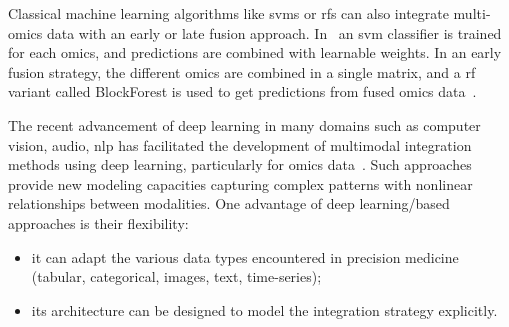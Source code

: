 \documentclass[../main.tex]{subfiles}
\begin{document}
	Classical machine learning algorithms like \glspl{svm} or \glspl{rf} can also integrate multi-omics data with an early or late fusion approach.
	In~\cite{CarrilloPerez2022} an \gls{svm} classifier is trained for each omics, and predictions are combined with learnable weights.
	In an early fusion strategy, the different omics are combined in a single matrix, and a \gls{rf} variant called BlockForest is used to get predictions from fused omics data~\cite{Hornung2019}.

	The recent advancement of deep learning in many domains such as computer vision, audio, \gls{nlp} has facilitated the development of multimodal integration methods using deep learning, particularly for omics data~\cite{Kang2021}.
	Such approaches provide new modeling capacities capturing complex patterns with nonlinear relationships between modalities.
	One advantage of deep learning\-/based approaches is their flexibility:
	\begin{itemize}[nosep]
	    \item it can adapt the various data types encountered in precision medicine (tabular, categorical, images, text, time-series);
	    \item its architecture can be designed to model the integration strategy explicitly.
	\end{itemize}

\end{document}
